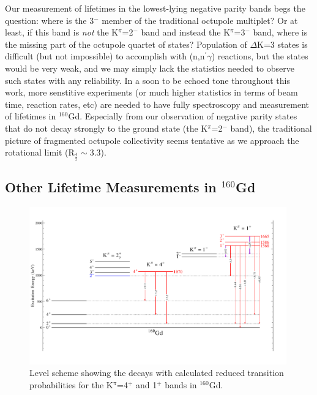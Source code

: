 Our measurement of lifetimes in the lowest-lying negative parity bands begs the question: where is the 3$^-$ member of the traditional octupole multiplet? Or at least, if this band is \textit{not} the K$^\pi$=2$^-$ band and instead the K$^\pi$=3$^-$ band, where is the missing part of the octupole quartet of states? Population of $\Delta$K=3 states is difficult (but not impossible) to accomplish with (n,n$^\prime\gamma$) reactions, but the states would be very weak, and we may simply lack the statistics needed to observe such states with any reliability. In a soon to be echoed tone throughout this work, more senstitive experiments (or much higher statistics in terms of beam time, reaction rates, etc) are needed to have fully spectroscopy and measurement of lifetimes in $^{160}$Gd. Especially from our observation of negative parity states that do not decay strongly to the ground state (the K$^\pi$=2$^-$ band), the traditional picture of fragmented octupole collectivity seems tentative as we approach the rotational limit (R$_{\frac{4}{2}}\sim$3.3).
\subsection{Other Lifetime Measurements in $^{160}$Gd}


\begin{center}
\begin{figure}[h!]
\includegraphics[width=0.99\textwidth]{figures/160Gd_posparity.pdf}
\caption{Level scheme showing the decays with calculated reduced transition probabilities for the K$^\pi$=4$^+$ and 1$^+$ bands in $^{160}$Gd. \label{fig:160Gd_posparity}}
\end{figure}
\end{center}


